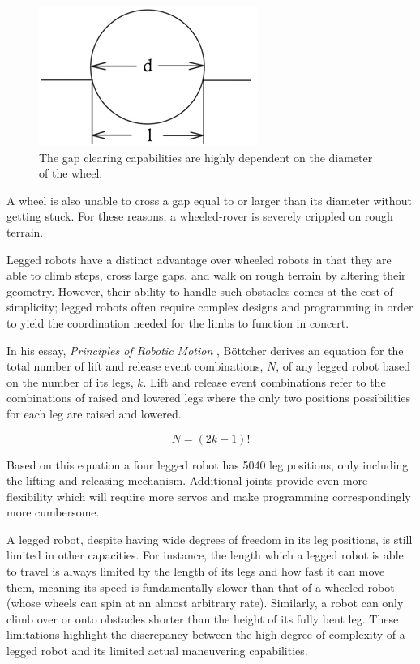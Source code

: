 \documentclass[12pt]{article}
\numberwithin{figure}{section}
\begin{document}
\begin{multicols}{2}
\begin{figure}[H]
\includegraphics{Gap_Limit.PNG}
\caption{The gap clearing capabilities are highly dependent on the diameter of the wheel. \cite{sanzari-telescopic-actuator}}
\label{fig:gap_limit}
\end{figure}

A wheel is  also unable to cross a gap equal to or larger than its diameter without getting stuck. For these reasons, a wheeled-rover is severely crippled on rough terrain. 

Legged robots have a distinct advantage over wheeled robots in that they are able to climb steps, cross large gaps, and walk on rough terrain by altering their geometry. However, their ability to handle such obstacles comes at the cost of simplicity; legged robots often require complex designs and programming in order to yield the coordination needed for the limbs to function in concert.

In his essay, \textit{Principles of Robotic Motion} \cite{bottcher-locomotion}, Böttcher derives an equation for the total number of lift and release event combinations, $N$, of any legged robot based on the number of its legs, $k$. Lift and release event combinations refer to the combinations of raised and lowered legs where the only two positions possibilities for each leg are raised and lowered. 

\begin{equation}
N = (2k - 1)!
\end{equation}

Based on this equation a four legged robot has 5040 leg positions, only including the lifting and releasing mechanism. Additional joints provide even more flexibility which will require more servos and make programming correspondingly more cumbersome. 

A legged robot, despite having wide degrees of freedom in its leg positions, is still limited in other capacities. For instance, the length which a legged robot is able to travel is always limited by the length of its legs and how fast it can move them, meaning its speed is fundamentally slower than that of a wheeled robot (whose wheels can spin at an almost arbitrary rate). Similarly, a robot can only climb over or onto obstacles shorter than the height of its fully bent leg. These limitations highlight the discrepancy between the high degree of complexity of a legged robot and its limited actual maneuvering capabilities.


\end{multicols}
\end{document}
